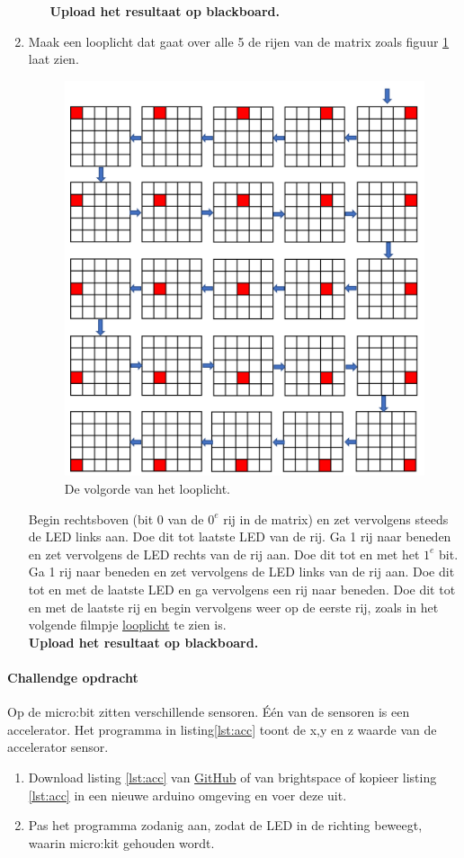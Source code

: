 \begin{enumerate}
\begin{enumerate}
\textbf{Upload het resultaat op blackboard.}
\end{enumerate}\label{opdr:loppl}
\item Maak een looplicht dat gaat over alle 5 de rijen van de matrix zoals figuur \ref{fig:loopl} laat zien.

\begin{figure}[H]
	\captionsetup{justification=centering}
\includegraphics[width=0.6 \linewidth]{figuren/looplicht}
\centering
\caption{De volgorde van het looplicht.}
\label{fig:loopl}
\end{figure}

Begin rechtsboven (bit 0 van de ${0^{e}}$ rij in de matrix) en zet vervolgens steeds de LED links aan. Doe dit tot laatste LED van de rij.
Ga 1 rij naar beneden en zet vervolgens de LED rechts van de rij aan. Doe dit tot en met het $1^{e}$ bit.
Ga 1 rij naar beneden en zet vervolgens de LED links van de rij aan. Doe dit tot en met de laatste LED en ga vervolgens een rij naar beneden.
Doe dit tot en met de laatste rij en begin vervolgens weer op de eerste rij, zoals in het volgende filmpje \href{https://www.youtube.com/shorts/8ZyYWEiXsm0} {
	looplicht}
	te zien is.\\
\textbf{Upload het resultaat op blackboard.}
\end{enumerate}

\paragraph{Challendge opdracht}\label{opdr:accSens}

Op de micro:bit zitten verschillende sensoren. Één van de sensoren is een accelerator.
Het programma in listing\ref{lst:acc} toont de x,y en z waarde van de accelerator sensor.
\begin{enumerate}

	\item Download  listing \ref{lst:acc} van \href{https://github.com/JohnVi-hhs/embsysP/tree/main/voorbeelden/accelerator.ino}{ GitHub} of van brightspace of kopieer listing \ref{lst:acc} in een nieuwe arduino omgeving en voer deze uit.
	\item Pas het programma zodanig aan, zodat de LED in de richting beweegt, waarin micro:kit gehouden wordt.

	\end{enumerate}

